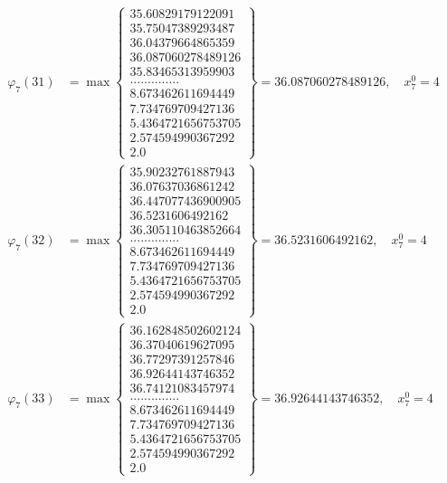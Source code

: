 \documentclass{article}
\begin{document}
\begin{align*}
  
  
  
\varphi_{7}(31) &= \max \left\{ \begin{array}{c}
35.60829179122091 \\
 35.75047389293487 \\
 36.04379664865359 \\
 36.087060278489126 \\
 35.83465313959903 \\
 .............. \\
 8.673462611694449 \\
 7.734769709427136 \\
 5.4364721656753705 \\
 2.574594990367292 \\
 2.0
\end{array} \right\} = 36.087060278489126, \quad x_{7}^0 = 4\\
  
  
  
  
\varphi_{7}(32) &= \max \left\{ \begin{array}{c}
35.90232761887943 \\
 36.07637036861242 \\
 36.447077436900905 \\
 36.5231606492162 \\
 36.305110463852664 \\
 .............. \\
 8.673462611694449 \\
 7.734769709427136 \\
 5.4364721656753705 \\
 2.574594990367292 \\
 2.0
\end{array} \right\} = 36.5231606492162, \quad x_{7}^0 = 4\\
  
  
  
  
\varphi_{7}(33) &= \max \left\{ \begin{array}{c}
36.162848502602124 \\
 36.37040619627095 \\
 36.77297391257846 \\
 36.92644143746352 \\
 36.74121083457974 \\
 .............. \\
 8.673462611694449 \\
 7.734769709427136 \\
 5.4364721656753705 \\
 2.574594990367292 \\
 2.0
\end{array} \right\} = 36.92644143746352, \quad x_{7}^0 = 4\\
  

\end{align*}
\end{document}

